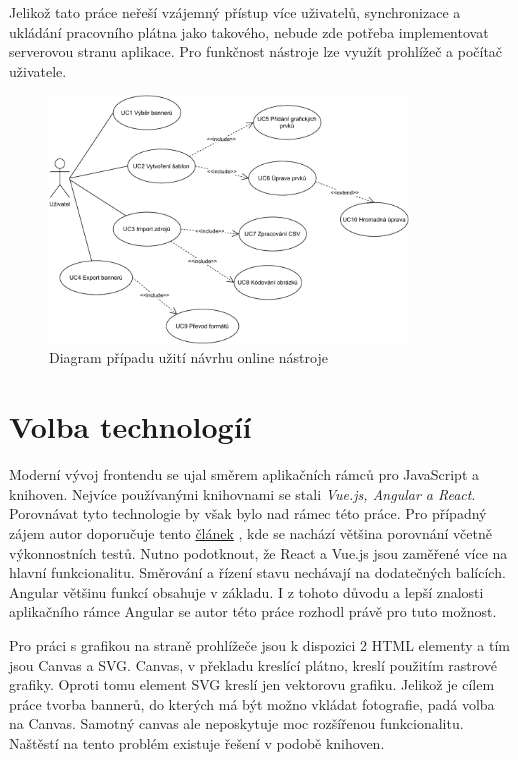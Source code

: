     Jelikož tato práce neřeší vzájemný přístup více uživatelů, synchronizace a ukládání pracovního plátna jako takového,
    nebude zde potřeba implementovat serverovou stranu aplikace. Pro funkčnost nástroje lze využít prohlížeč a počítač uživatele.

    \begin{figure}
        \centering
        \includegraphics[width=0.85\textwidth]{Figures/use-case.pdf}
        \caption[Diagram případu užití]{Diagram případu užití návrhu online nástroje}
        \label{fig:use-case-diagram}
    \end{figure}

    \section{Volba technologíí}
    Moderní vývoj frontendu se ujal směrem aplikačních rámců pro JavaScript a knihoven. Nejvíce používanými knihovnami se stali \emph{Vue.js, Angular a React}.
    Porovnávat tyto technologie by však bylo nad rámec této práce.
    Pro případný zájem autor doporučuje tento \href{https://vuejs.org/v2/guide/comparison.html}{článek} \cite{js:framework-comparion},
    kde se nachází většina porovnání včetně výkonnostních testů.
    Nutno podotknout, že React a Vue.js jsou zaměřené více na hlavní funkcionalitu. Směrování a řízení stavu nechávají
    na dodatečných balících. Angular většinu funkcí obsahuje v základu.
    I z tohoto důvodu a lepší znalosti aplikačního rámce Angular se autor této práce rozhodl právě pro tuto možnost. 

    Pro práci s grafikou na straně prohlížeče jsou k dispozici 2 HTML elementy a tím jsou Canvas a SVG.
    Canvas, v překladu kreslící plátno, kreslí použitím rastrové grafiky. Oproti tomu element SVG kreslí jen vektorovu grafiku.
    Jelikož je cílem práce tvorba bannerů, do kterých má být možno vkládat fotografie, padá volba na Canvas.
    Samotný canvas ale neposkytuje moc rozšířenou funkcionalitu. Naštěstí na tento problém existuje řešení v podobě knihoven.

